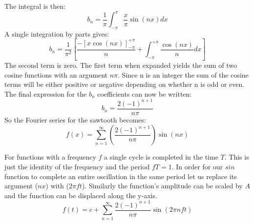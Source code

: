 \documentclass{article}
\begin{document}
The integral is then:
%
\begin{equation}
b_{n} = \frac{1}{\pi} \int_{-\pi}^{\pi} \frac{x}{\pi} \sin(nx) dx
\end{equation}
%
A single integration by parts gives:
%
\begin{equation}
b_{n} = \frac{1}{\pi^{2}}\left[\frac{-[x \cos(nx)]_{-\pi}^{+\pi}}{n} + \int_{-\pi}^{+\pi} \frac{\cos(nx)}{n} dx\right]
\end{equation}
%
The second term is zero. The first term when expanded yields the sum of two cosine functions with 
an argument $n\pi$. Since n is an integer the sum of the cosine terms will be either positive
or negative depending on whether n is odd or even. The final expression for the $b_{n}$ coefficients
can now be written:
%
\begin{equation}
b_{n} = \frac{2(-1)^{n+1}}{n \pi}
\end{equation}
%
So the Fourier series for the sawtooth becomes:
%
\begin{equation}
f(x) = \sum_{n=1}^{\infty} (\frac{2(-1)^{n+1}}{n\pi})\sin(nx)
\end{equation}
%

For functions with a frequency $f$ a single cycle is completed in the time $T$.
This is just the identity of the frequency and the period $fT=1$. In order for
our $sin$ function to complete an entire oscillation in the same period let
us replace its argument ($nx$) with ($2\pi f t$). Similarly the function's
amplitude can be scaled by $A$ and the function can be displaced along the
y-axis.
%
\begin{equation}
f(t) = c + \sum_{n=1}^{\infty} \frac{2(-1)^{n+1}}{n\pi}\sin(2\pi n ft)
\end{equation}
%

\scriptsize

\end{document}

